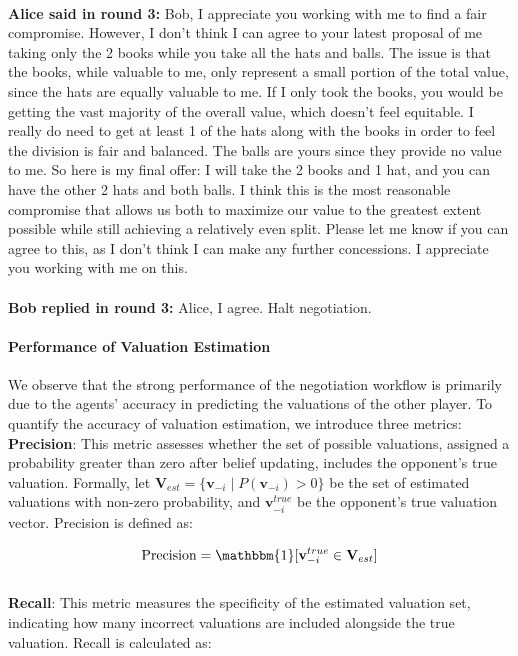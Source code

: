 \begin{tcolorbox}[colback=gray!5,colframe=green!40!black,title=\textbf{Example Negotiation Process: workflow-LLM vs. workflow-LLM with Opus}]
\\
\textbf{Alice said in round 3:} Bob, I appreciate you working with me to find a fair compromise. However, I don't think I can agree to your latest proposal of me taking only the 2 books while you take all the hats and balls. The issue is that the books, while valuable to me, only represent a small portion of the total value, since the hats are equally valuable to me. If I only took the books, you would be getting the vast majority of the overall value, which doesn't feel equitable. I really do need to get at least 1 of the hats along with the books in order to feel the division is fair and balanced. The balls are yours since they provide no value to me. So here is my final offer: I will take the 2 books and 1 hat, and you can have the other 2 hats and both balls. I think this is the most reasonable compromise that allows us both to maximize our value to the greatest extent possible while still achieving a relatively even split. Please let me know if you can agree to this, as I don't think I can make any further concessions. I appreciate you working with me on this.\\
\\
\textbf{Bob replied in round 3:} Alice, I agree. Halt negotiation.
\end{tcolorbox}

\paragraph{Performance of Valuation Estimation}
We observe that the strong performance of the negotiation workflow is primarily due to the agents' accuracy in predicting the valuations of the other player. To quantify the accuracy of valuation estimation, we introduce three metrics:
\\
\textbf{Precision}: This metric assesses whether the set of possible valuations, assigned a probability greater than zero after belief updating, includes the opponent's true valuation. Formally, let $\mathbf{V}_{est} = \{\mathbf{v}_{-i}\mid P(\mathbf{v}_{-i}) > 0\}$ be the set of estimated valuations with non-zero probability, and $\mathbf{v}_{-i}^{true}$ be the opponent's true valuation vector. Precision is defined as:

$$\text{Precision} = \mathbbm{1}[\mathbf{v}_{-i}^{true}\in \mathbf{V}_{est}]$$
\\
\textbf{Recall}: This metric measures the specificity of the estimated valuation set, indicating how many incorrect valuations are included alongside the true valuation. Recall is calculated as: 

